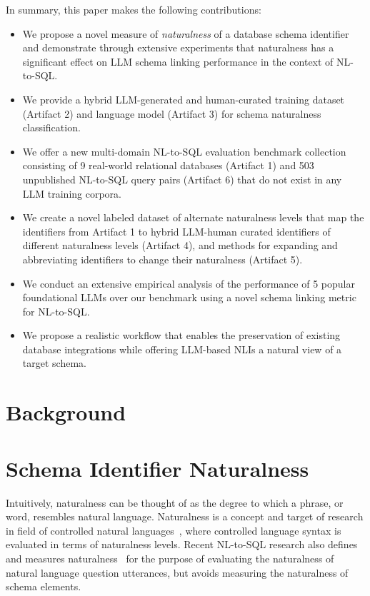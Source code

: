 In summary, this paper makes the following contributions:
\begin{itemize}
  \item We propose a novel measure of \emph{naturalness} of a database schema identifier and demonstrate through extensive experiments that naturalness has a significant effect on LLM schema linking performance in the context of NL-to-SQL.
  \item We provide a hybrid LLM-generated and human-curated training dataset (Artifact 2) and language model (Artifact 3) for schema naturalness classification.
  \item We offer a new multi-domain NL-to-SQL evaluation benchmark collection consisting of 9 real-world relational databases (Artifact 1) and 503 unpublished NL-to-SQL query pairs (Artifact 6) that do not exist in any LLM training corpora.
  \item We create a novel labeled dataset of alternate naturalness levels that map the identifiers from Artifact 1 to hybrid LLM-human curated identifiers of different naturalness levels (Artifact 4), and methods for expanding and abbreviating identifiers to change their naturalness (Artifact 5).
  \item We conduct an extensive empirical analysis of the performance of 5 popular foundational LLMs over our benchmark using a novel schema linking metric for NL-to-SQL.
  \item We propose a realistic workflow that enables the preservation of existing database integrations while offering LLM-based NLIs a natural view of a target schema.
\end{itemize}

% 
\section{Background}



\section{Schema Identifier Naturalness}


Intuitively, naturalness can be thought of as the degree to which a phrase, or word, resembles natural language. 
Naturalness is a concept and target of research in field of controlled natural languages~\cite{10.1162/COLI_a_00168}, where controlled language syntax is evaluated in terms of naturalness levels. 
Recent NL-to-SQL research also defines and measures naturalness~\cite{10.14778/3494124.3494139} for the purpose of evaluating the naturalness of natural language question utterances, but avoids measuring the naturalness of schema elements.

